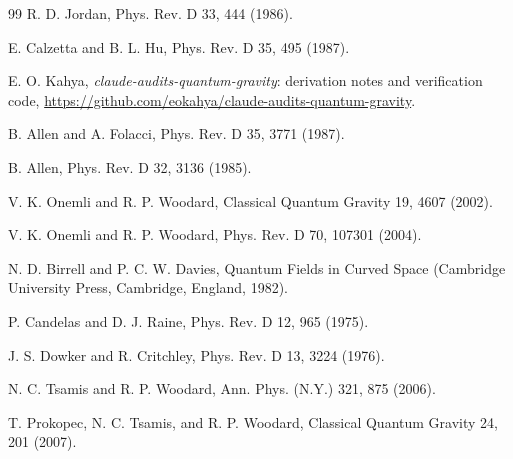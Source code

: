 \documentclass[aps,prd,onecolumn,10pt,nofootinbib,floatfix]{revtex4-2}
\begin{document}
\begin{thebibliography}{99}
R. D. Jordan, Phys. Rev. D 33, 444 (1986).

E. Calzetta and B. L. Hu, Phys. Rev. D 35, 495 (1987).

E. O. Kahya, \emph{claude-audits-quantum-gravity}: derivation notes and verification code,
\url{https://github.com/eokahya/claude-audits-quantum-gravity}.

B. Allen and A. Folacci, Phys. Rev. D 35, 3771 (1987).

B. Allen, Phys. Rev. D 32, 3136 (1985).

V. K. Onemli and R. P. Woodard, Classical Quantum Gravity 19, 4607 (2002).

V. K. Onemli and R. P. Woodard, Phys. Rev. D 70, 107301 (2004).

N. D. Birrell and P. C. W. Davies, Quantum Fields in Curved Space (Cambridge University Press, Cambridge, England, 1982).

P. Candelas and D. J. Raine, Phys. Rev. D 12, 965 (1975).

J. S. Dowker and R. Critchley, Phys. Rev. D 13, 3224 (1976).

N. C. Tsamis and R. P. Woodard, Ann. Phys. (N.Y.) 321, 875 (2006).

T. Prokopec, N. C. Tsamis, and R. P. Woodard, Classical Quantum Gravity 24, 201 (2007).

\end{thebibliography}
\end{document}
